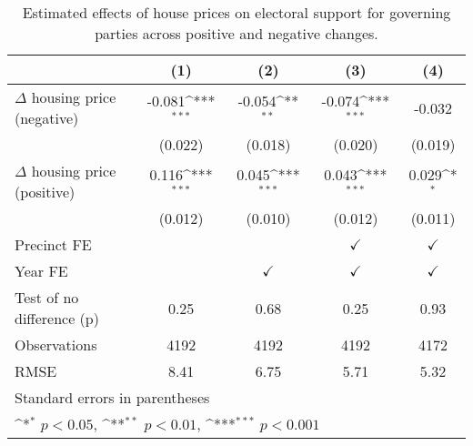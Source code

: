 \begin{table}[htbp]\centering
\def\sym#1{\ifmmode^{#1}\else\(^{#1}\)\fi}
\caption{Estimated effects of house prices on electoral support for governing parties across positive and negative changes.} \label{preposneg}
\begin{tabular}{l*{4}{c}}
\hline\hline
                    &\multicolumn{1}{c}{(1)}         &\multicolumn{1}{c}{(2)}         &\multicolumn{1}{c}{(3)}         &\multicolumn{1}{c}{(4)}         \\
\hline
$\Delta$ housing price (negative)&      -0.081\sym{***}&      -0.054\sym{**} &      -0.074\sym{***}&      -0.032         \\
                    &     (0.022)         &     (0.018)         &     (0.020)         &     (0.019)         \\
[1em]
$\Delta$ housing price (positive)&       0.116\sym{***}&       0.045\sym{***}&       0.043\sym{***}&       0.029\sym{*}  \\
                    &     (0.012)         &     (0.010)         &     (0.012)         &     (0.011)         \\
[1em]
\hline Precinct FE  &                     &                     &$\checkmark$         &$\checkmark$         \\
[1em]
Year FE             &                     &$\checkmark$         &$\checkmark$         &$\checkmark$         \\
\hline
Test of no difference (p)&        0.25         &        0.68         &        0.25         &        0.93         \\
Observations        &        4192         &        4192         &        4192         &        4172         \\
RMSE                &        8.41         &        6.75         &        5.71         &        5.32         \\
\hline\hline
\multicolumn{5}{l}{\footnotesize Standard errors in parentheses}\\
\multicolumn{5}{l}{\footnotesize \sym{*} \(p<0.05\), \sym{**} \(p<0.01\), \sym{***} \(p<0.001\)}\\
\end{tabular}
\end{table}
